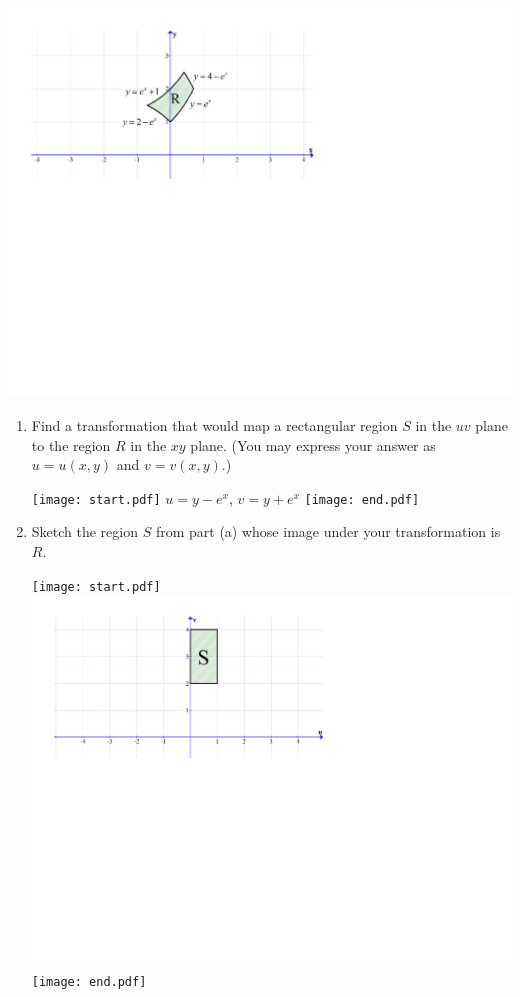 \documentclass[12pt]{article}
\begin{document}
\begin{enumerate}
\begin{center}
\includegraphics[scale=0.7]{region3.pdf}
\end{center}

\begin{enumerate}

\item Find a transformation that would map a rectangular region $S$ in the $uv$ plane to the region $R$ in the $xy$ plane.  (You may express your answer as $u=u(x,y)$ and $v=v(x,y)$.)

\texttt{[image: start.pdf]}
{{$u=y-e^x$, $v=y+e^x$}}
\texttt{[image: end.pdf]}


\item Sketch the region $S$ from part (a) whose image under your transformation is $R$.

\texttt{[image: start.pdf]}
{{\includegraphics[scale=0.5]{region3s.pdf}}}
\texttt{[image: end.pdf]}



\end{enumerate}
\end{enumerate}
\end{document}
